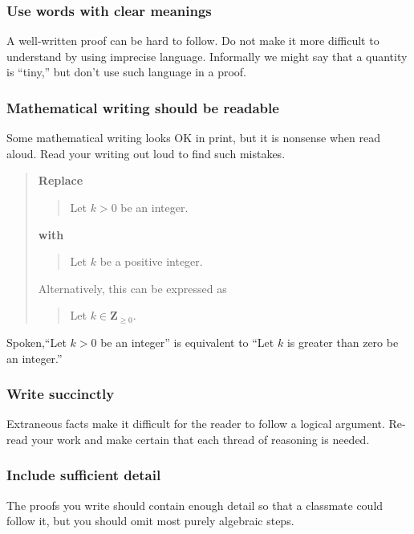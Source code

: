 \documentclass[12pt,fleqn]{article}
\newcounter{ex}\setcounter{ex}{0}
\newcounter{se}\setcounter{se}{0}
\begin{document}
 \subsubsection{  Use words with clear meanings}

A \mbox{well-written} proof can be hard to follow. Do not make it more
difficult to understand by using imprecise language.  Informally 
we might say that a quantity is ``tiny,'' but don't use such language in a proof.



 \subsubsection{ Mathematical writing should be readable}

Some mathematical writing looks OK in print, but it is nonsense when read
aloud.  Read your writing out loud to find such mistakes.

\begin{quote}
\textbf{Replace}
\begin{quote}
  Let \(k > 0\) be an integer.
\end{quote}
\textbf{with}
\begin{quote}
  Let \(k\) be a positive integer.
\end{quote}
Alternatively,  this can be expressed as
\begin{quote}
  Let \(k \in \mathbf{Z}_ {\geq 0}.\)
\end{quote}
\end{quote}
Spoken,``Let \(k > 0\) be an integer'' is equivalent to
``Let \(k\) is greater than zero  be an integer.''



 \subsubsection{  Write succinctly}  

Extraneous facts make it difficult for the reader to follow a logical
argument.  Re-read your work and make certain that each thread of
reasoning is needed.

 \subsubsection{  Include sufficient detail}  

The proofs you write should contain enough detail so that a 
classmate could  follow it, but you should omit most purely algebraic 
steps. 
\end{document}
